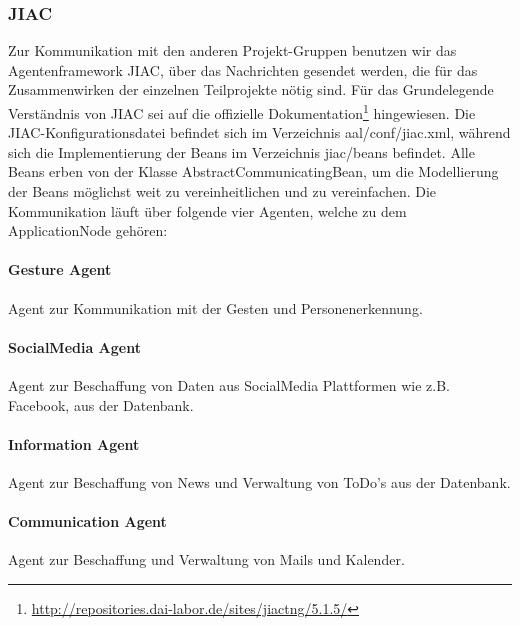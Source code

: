 \documentclass[10pt,a4paper]{report}
\newcommand{\code}[1]{{\fontfamily{cmvtt}\selectfont #1}}
\begin{document}
         \subsubsection{JIAC}
        Zur Kommunikation mit den anderen Projekt-Gruppen benutzen wir das Agentenframework JIAC, über das Nachrichten gesendet werden, die für das Zusammenwirken der einzelnen Teilprojekte nötig sind. Für das Grundelegende Verständnis von JIAC sei auf die offizielle Dokumentation\footnote{\href{http://repositories.dai-labor.de/sites/jiactng/5.1.5/}{http://repositories.dai-labor.de/sites/jiactng/5.1.5/}} hingewiesen. Die JIAC-Konfigurationsdatei befindet sich im Verzeichnis \code{aal/conf/jiac.xml}, während sich die Implementierung der Beans im Verzeichnis \code{jiac/beans} befindet. Alle Beans erben von der Klasse \code{AbstractCommunicatingBean}, um die Modellierung der Beans möglichst weit zu vereinheitlichen und zu vereinfachen. Die Kommunikation läuft über folgende vier Agenten, welche zu dem
        ApplicationNode gehören:
        \paragraph{Gesture Agent}
            Agent zur Kommunikation mit der Gesten und Personenerkennung.
        \paragraph{SocialMedia Agent}
            Agent zur Beschaffung von Daten aus
            SocialMedia Plattformen wie z.B. Facebook, aus der Datenbank.
        \paragraph{Information Agent}
            Agent zur Beschaffung von News und Verwaltung
            von ToDo's aus der Datenbank.
        \paragraph{Communication Agent}
            Agent zur Beschaffung und Verwaltung von
            Mails und Kalender.
\end{document}
